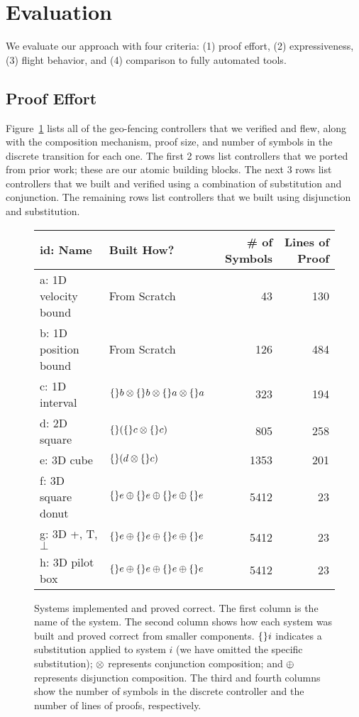 \section{Evaluation}
\label{sec:eval}
We evaluate our approach with four criteria: (1) proof effort, (2)
expressiveness, (3) flight behavior, and (4) comparison to fully automated
tools.

\subsection{Proof Effort}
Figure~\ref{fig:monitors} lists all of the geo-fencing controllers that we
verified and flew, along with the composition mechanism, proof size, and
number of symbols in the discrete transition for each one.  The first 2
rows list controllers that we ported from prior work; these are our atomic
building blocks.  The next 3 rows list controllers that we built and
verified using a combination of substitution and conjunction.  The
remaining rows list controllers that we built using disjunction and
substitution.

\begin{figure}
\begin{tabular}{l|l|r|r}
id: Name & Built How? & \# of Symbols & Lines of Proof \\
\hline 
a: 1D velocity bound & From Scratch & 43 & 130 \\
b: 1D position bound & From Scratch & 126 & 484 \\
c: 1D interval & $\{\}b \otimes \{\}b \otimes \{\}a \otimes \{\}a$ & 323 & 194 \\
d: 2D square & $\{\}(\{\}c \otimes \{\}c)$ & 805 & 258 \\
e: 3D cube & $\{\}(d \otimes \{\}c)$ & 1353 & 201 \\
f: 3D square donut & $\{\}e\oplus\{\}e\oplus\{\}e\oplus\{\}e$ & 5412 & 23 \\
g: 3D +, T, $\bot$ & $\{\}e\oplus\{\}e\oplus\{\}e\oplus\{\}e$ & 5412 & 23 \\
h: 3D pilot box & $\{\}e\oplus\{\}e\oplus\{\}e\oplus\{\}e$ & 5412 & 23 \\
\end{tabular}
\caption{Systems implemented and proved correct. The first column is the name of the system. The second column shows how each system was built and proved correct from smaller components. $\{\}i$ indicates a substitution applied to system $i$ (we have omitted the specific substitution); $\otimes$ represents conjunction composition; and $\oplus$ represents disjunction composition. The third and fourth columns show the number of symbols in the discrete controller and the number of lines of proofs, respectively.}
\label{fig:monitors}
\end{figure}

